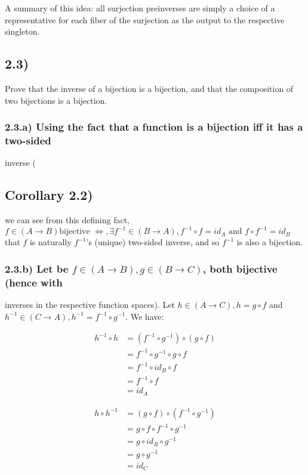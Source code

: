 \documentclass[12pt, letterpaper, twoside]{report}
\begin{document}
A summary of this idea: all surjection preinverses are simply a choice of a representative for each fiber of the surjection as the output to the respective singleton.



\subsection*{2.3)}

Prove that the inverse of a bijection is a bijection, and that the composition
of two bijections is a bijection.

\subsubsection*{2.3.a) Using the fact that a function is a bijection iff it has a two-sided }inverse (\subsection*{Corollary 2.2)}

 we can see from this defining fact, $f \in (A \to B) \text{bijective } \Leftrightarrow, \exists f^{-1} \in (B \to A), f^{-1} \circ f = id_A \text { and } f \circ f^{-1} = id_B$ that $f$ is naturally $f^{-1}$'s (unique) two-sided inverse, and so $f^{-1}$ is also a bijection.

\subsubsection*{2.3.b) Let be $f \in (A \to B), g \in (B \to C)$, both bijective (hence with }inverses in the respective function spaces). Let $h \in (A \to C), h = g \circ f$ and $h^{-1} \in (C \to A), h^{-1} = f^{-1} \circ g^{-1}$. We have:

$$
\begin{aligned}
h^{-1} \circ h &= (f^{-1} \circ g^{-1}) \circ (g \circ f) \\
               &=  f^{-1} \circ g^{-1}  \circ  g \circ f  \\
               &=  f^{-1} \circ          id_B    \circ f  \\
               &=  f^{-1} \circ                        f  \\
               &=  id_A
\end{aligned}
$$

$$
\begin{aligned}
h \circ h^{-1} &= (g \circ f) \circ (f^{-1} \circ g^{-1}) \\
               &=  g \circ f  \circ  f^{-1} \circ g^{-1}  \\
               &=  g \circ     id_B         \circ g^{-1}  \\
               &=  g \circ                        g^{-1}  \\
               &=  id_C
\end{aligned}
$$
\end{document}

